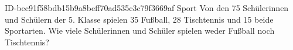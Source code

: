 \begin{exercise}
      {ID-bec91f58bdb15b9a8beff70ad535c3c79f3669af}
      {Sport}
  \ifproblem\problem
    Von den 75 Schülerinnen und Schülern der 5. Klasse spielen 35 Fußball,
    28 Tischtennis und 15 beide Sportarten. Wie viele Schülerinnen und Schüler
    spielen weder Fußball noch Tischtennis?
  \fi
\end{exercise}
